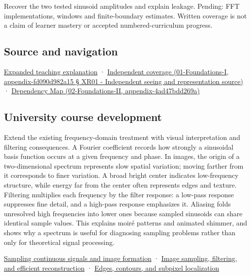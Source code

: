 Recover the two tested sinusoid amplitudes and explain leakage. Pending: FFT implementations, windows and finite-boundary estimates. Written coverage is not a claim of learner mastery or accepted numbered-curriculum progress.

\subsection{Source and navigation}\label{source-and-navigation}

\href{Continuous\%20Notes/University\%20-\%20Worlds,\%20Images\%20and\%20Inference\%20-\%20Graphics,\%20Vision\%20and\%20Photography\#Fourier\%20coordinates\%20reveal\%20what\%20a\%20filter\%20removes}{Expanded teaching explanation} · \href{}{Independent coverage (01-Foundations-I, appendix-fd090d982a15 § XR01 - Independent seeing and representation source)} · \href{}{Dependency Map (02-Foundations-II, appendix-4ad47bdd269a)}

\subsection{University course development}\label{university-course-development}

Extend the existing frequency-domain treatment with visual interpretation and filtering consequences. A Fourier coefficient records how strongly a sinusoidal basis function occurs at a given frequency and phase. In images, the origin of a two-dimensional spectrum represents slow spatial variation; moving farther from it corresponds to finer variation. A broad bright center indicates low-frequency structure, while energy far from the center often represents edges and texture. Filtering multiplies each frequency by the filter response: a low-pass response suppresses fine detail, and a high-pass response emphasizes it. Aliasing folds unresolved high frequencies into lower ones because sampled sinusoids can share identical sample values. This explains moiré patterns and animated shimmer, and shows why a spectrum is useful for diagnosing sampling problems rather than only for theoretical signal processing.

\href{Continuous\%20Notes/University\%20-\%20Worlds,\%20Images\%20and\%20Inference\%20-\%20Graphics,\%20Vision\%20and\%20Photography\#Sampling\%20continuous\%20signals\%20and\%20image\%20formation}{Sampling continuous signals and image formation} · \href{Continuous\%20Notes/University\%20-\%20Worlds,\%20Images\%20and\%20Inference\%20-\%20Graphics,\%20Vision\%20and\%20Photography\#Image\%20sampling,\%20filtering,\%20and\%20efficient\%20reconstruction}{Image sampling, filtering, and efficient reconstruction} · \href{Continuous\%20Notes/University\%20-\%20Worlds,\%20Images\%20and\%20Inference\%20-\%20Graphics,\%20Vision\%20and\%20Photography\#Edges,\%20contours,\%20and\%20subpixel\%20localization}{Edges, contours, and subpixel localization}
